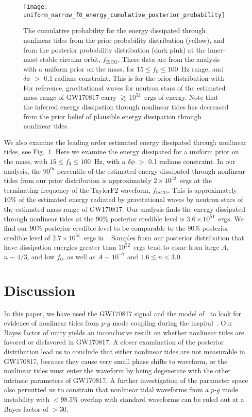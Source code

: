 \begin{figure}[th]
\texttt{[image: uniform\_narrow\_f0\_energy\_cumulative\_posterior\_probability]}
\caption{The cumulative probability for the energy dissipated through nonlinear tides from the prior probability distribution (yellow), and from the posterior probability distribution (dark pink) at the inner-most stable circular orbit, $f_\mathrm{ISCO}$. These data are from the analysis with a uniform prior on the mass, for $15 \leq f_0 \leq 100$~Hz range, and $\delta \phi$ $>$ 0.1 radians constraint. This is for the prior distribution with For reference, gravitational waves for neutron stars of the estimated mass range of GW170817 carry $\gtrsim \, 10^{53}$~ergs of energy. Note that the inferred energy dissipation through nonlinear tides has decreased from the prior belief of plausible energy dissipation through nonlinear tides.
}
\label{fig:uniform_f0_small_NL_energy}
\end{figure}

We also examine the leading order estimated energy dissipated through nonlinear tides, see Fig.~\ref{fig:uniform_f0_small_NL_energy}. Here we examine the energy dissipated for a uniform prior on the mass, with $15 \leq f_0 \leq 100$~Hz, with a $\delta \phi$ $>$ 0.1 radians constraint. In our analysis, the $90^{\mathrm{th}}$ percentile of the estimated energy dissipated through nonlinear tides from our prior distribution is approximately $2 \times 10^{52}$~ergs at the terminating frequency of the TaylorF2 waveform, $f_\mathrm{ISCO}$. This is approximately $10 \%$ of the estimated energy radiated by gravitational waves by neutron stars of the estimated mass range of GW170817. Our analysis finds the energy dissipated through nonlinear tides at the $90\%$ posterior credible level is $3.6 \times 10^{51}$~ergs. We find our $90\%$ posterior credible level to be comparable to the $90\%$ posterior credible level of $2.7 \times 10^{51}$~ergs in~\cite{abbott2019constraining}. Samples from our posterior distribution that have dissipation energies greater than $10^{52}$~ergs tend to come from large $A$, $n \sim 4/3$, and low $f_0$, as well as $A \sim 10^{-7}$ and $1.6 \lesssim n < 3.0$.

\section{Discussion}
In this paper, we have used the GW170817 signal and the model of~\cite{Essick:2016tkn} to look for evidence of nonlinear tides from $p$-$g$ mode coupling during the inspiral~\citep{Weinberg:2013pbi,Weinberg:2015pxa,Zhou:2018tvc}. Our Bayes factor of unity yields an inconclusive result on whether nonlinear tides are favored or disfavored in GW170817. A closer examination of the posterior distribution lead us to conclude that either nonlinear tides are not measurable in GW170817, because they cause very small phase shifts to waveform, or the nonlinear tides must enter the waveform by being degenerate with the other intrinsic parameters of GW170817. A further investigation of the parameter space also permitted us to constrain that nonlinear tidal waveforms from a $p$-$g$ mode instability with $<98.5 \%$ overlap with standard waveforms can be ruled out at a Bayes factor of $>30$.

